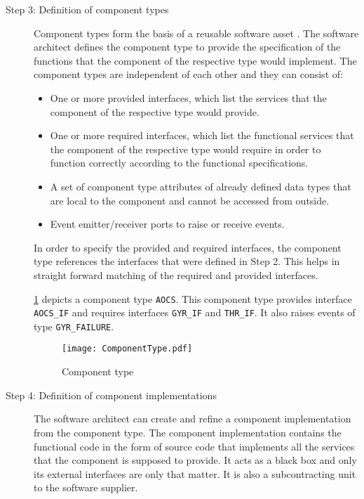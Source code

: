 \begin{description}
\item [Step 3: Definition of component types] Component types form the basis of a reusable software asset \cite{CompBasedProcess}. The software architect defines the component type to provide the specification of the functions that the component of the respective type would implement. The component types are independent of each other and they can consist of:
\begin{itemize}
\item One or more provided interfaces, which list the services that the component of the respective type would provide.
\item One or more required interfaces, which list the functional services that the component of the respective type would require in order to function correctly according to the functional specifications.
\item A set of component type attributes of already defined data types that are local to the component and cannot be accessed from outside.
\item Event emitter/receiver ports to raise or receive events.
\end{itemize}

In order to specify the provided and required interfaces, the component type references the interfaces that were defined in Step 2. This helps in straight forward matching of the required and provided interfaces.  

\cref{fig: Component type} depicts a component type \texttt{AOCS}. This component type provides interface \texttt{AOCS\_IF} and requires interfaces \texttt{GYR\_IF} and \texttt{THR\_IF}. It also raises events of type \texttt{GYR\_FAILURE}. 

\begin{figure}[h]
	\centering
	\texttt{[image: ComponentType.pdf]}
	\caption{Component type}
	\label{fig: Component type}
\end{figure}

\item [Step 4: Definition of component implementations] The software architect can create and refine a component implementation from the component type. The component implementation contains the functional code in the form of source code that implements all the services that the component is supposed to provide. It acts as a  black box and only its external interfaces are only that matter. It is also a subcontracting unit to the software supplier. 


\end{description}
